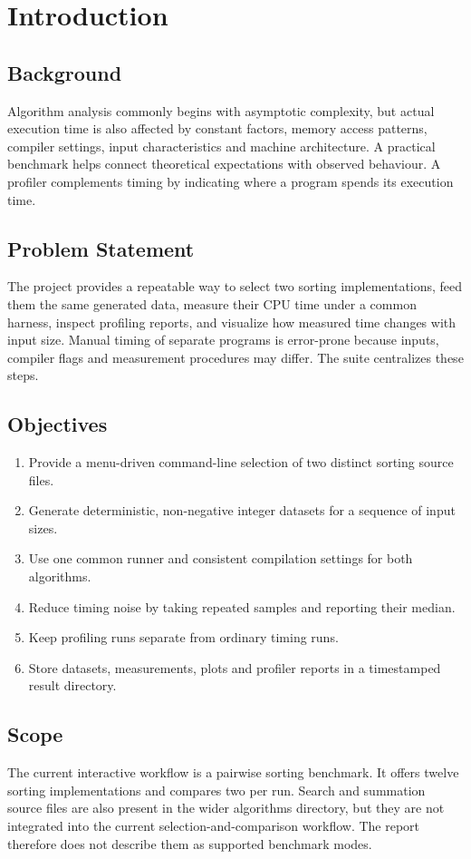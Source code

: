 \documentclass[12pt,a4paper,oneside]{report}
\begin{document}
\chapter{Introduction}
\section{Background}
Algorithm analysis commonly begins with asymptotic complexity, but actual execution time is also affected by constant factors, memory access patterns, compiler settings, input characteristics and machine architecture. A practical benchmark helps connect theoretical expectations with observed behaviour. A profiler complements timing by indicating where a program spends its execution time.
\section{Problem Statement}
The project provides a repeatable way to select two sorting implementations, feed them the same generated data, measure their CPU time under a common harness, inspect profiling reports, and visualize how measured time changes with input size. Manual timing of separate programs is error-prone because inputs, compiler flags and measurement procedures may differ. The suite centralizes these steps.
\section{Objectives}
\begin{enumerate}[leftmargin=*]
\item Provide a menu-driven command-line selection of two distinct sorting source files.
\item Generate deterministic, non-negative integer datasets for a sequence of input sizes.
\item Use one common runner and consistent compilation settings for both algorithms.
\item Reduce timing noise by taking repeated samples and reporting their median.
\item Keep profiling runs separate from ordinary timing runs.
\item Store datasets, measurements, plots and profiler reports in a timestamped result directory.
\end{enumerate}
\section{Scope}
The current interactive workflow is a pairwise sorting benchmark. It offers twelve sorting implementations and compares two per run. Search and summation source files are also present in the wider algorithms directory, but they are not integrated into the current selection-and-comparison workflow. The report therefore does not describe them as supported benchmark modes.
\end{document}
